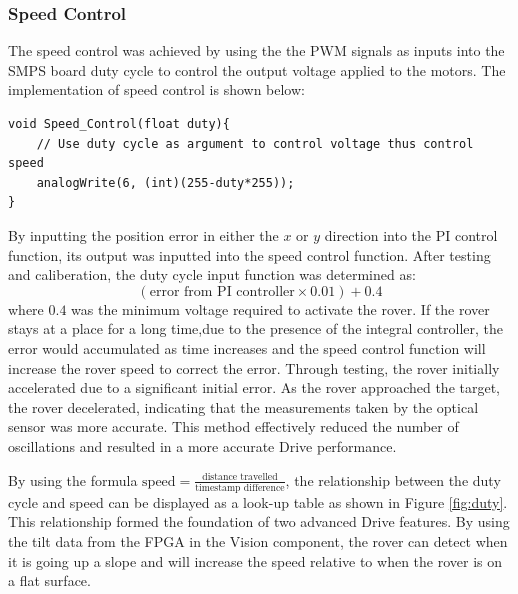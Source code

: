 \documentclass[11pt, a4paper]{article}
\begin{document}
\subsubsection{Speed Control}

The speed control was achieved by using the the PWM signals as inputs into the SMPS board duty cycle to control the output voltage applied to the motors. The implementation of speed control is shown below:

\begin{lstlisting}
void Speed_Control(float duty){
    // Use duty cycle as argument to control voltage thus control speed
    analogWrite(6, (int)(255-duty*255)); 
}
\end{lstlisting}

By inputting the position error in either the $x$ or $y$ direction into the PI control function, its output was  inputted into the speed control function. After testing and caliberation, the duty cycle input function was determined as:
$$
    (\text{error from PI controller} \times 0.01) + 0.4
$$
where $0.4$ was the minimum voltage required to activate the rover. If the rover stays at a place for a long time,due to the presence of the integral controller, the error would accumulated as time increases and the speed control function will increase the rover speed to correct the error. Through testing, the rover initially accelerated due to a significant initial error. As the rover approached the target, the rover decelerated, indicating that the measurements taken by the optical sensor was more accurate. This method effectively reduced the number of oscillations and resulted in a more accurate Drive performance.

By using the formula $\text{speed} = \frac{\text{distance travelled}}{\text{timestamp difference}}$, the relationship between the duty cycle and speed can be displayed as a look-up table as shown in Figure \ref{fig:duty}. This relationship formed the foundation of two advanced Drive features. By using the tilt data from the FPGA in the Vision component, the rover can detect when it is going up a slope and will increase the speed relative to when the rover is on a flat surface.

\pagebreak
\end{document}
